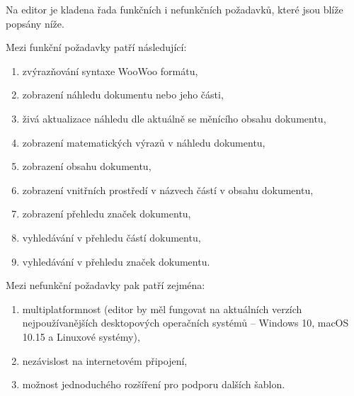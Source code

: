 Na editor je kladena řada funkčních i nefunkčních požadavků, které jsou blíže popsány níže.

Mezi funkční požadavky patří následující:

\begin{enumerate}[label=\textbf{F\arabic*}, ref=F\arabic*]
    \item zvýrazňování syntaxe WooWoo formátu,
    \item zobrazení náhledu dokumentu nebo jeho části,
    \item živá aktualizace náhledu dle aktuálně se měnícího obsahu dokumentu,
    \item zobrazení matematických výrazů v náhledu dokumentu,
    \item zobrazení obsahu dokumentu,
    \item zobrazení vnitřních prostředí v názvech částí v obsahu dokumentu,
    \item zobrazení přehledu značek dokumentu,
    \item vyhledávání v přehledu částí dokumentu,
    \item vyhledávání v přehledu značek dokumentu.
\end{enumerate}

Mezi nefunkční požadavky pak patří zejména:

\begin{enumerate}[label=\textbf{N\arabic*}, ref=N\arabic*]
    \item multiplatformnost (editor by měl fungovat na aktuálních verzích nejpoužívanějších desktopových operačních
        systémů – Windows 10, macOS 10.15 a Linuxové systémy),
    \item nezávislost na internetovém připojení,
    \item možnost jednoduchého rozšíření pro podporu dalších šablon.
\end{enumerate}
